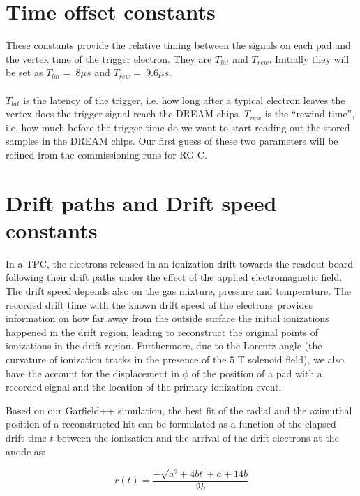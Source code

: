 \documentclass[12pt]{article}
\begin{document}
   
   \section {Time offset constants}
  
	These constants provide the relative timing between the signals on each pad
	and the vertex time of the trigger electron. They are
   $T_{lat}$ and $T_{rew}$. Initially they will be set as $T_{lat}=~8\mu s$ and 
   $T_{rew}=~9.6\mu s$.
~\\
~\\
$T_{lat}$ is the latency of the trigger, i.e. how long after a typical electron 
leaves the vertex does the trigger signal %
reach the DREAM chips. %
$T_{rew}$ is the ``rewind time'', i.e. how much before the trigger time do we 
want to start reading out the stored samples in the DREAM chips. Our first 
guess of these two parameters will be refined from the commissioning runs for RG-C. 
   
  
   \section{Drift paths and Drift speed constants}
    In a TPC, the electrons released in an ionization drift towards the readout 
  board following their drift paths under the effect of the applied 
  electromagnetic field. The drift speed depends also on the gas mixture, pressure and
  temperature. The 
  recorded drift time with the known drift speed of the electrons provides 
  information on how far away from the outside surface the initial ionizations happened in the drift region, 
  leading to reconstruct the original points of ionizations in the drift 
  region. Furthermore, due to the Lorentz angle (the curvature of ionization tracks in the
  presence of the 5 T solenoid field), we also have the account for the displacement in $\phi$ 
  of the position of a pad with a recorded signal and the location of the primary ionization event.
  
  Based on our Garfield++ simulation, the best fit of the radial and the azimuthal 
  position  of a reconstructed hit can be formulated as a function of the elapsed drift time $t$ 
  between the ionization and the arrival of the drift electrons at the anode as: 

\begin{equation}
    r(t)= \frac{-\sqrt{a^2 + 4bt} + a + 14b}{2b}
\end{equation}
  
\end{document}
